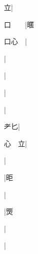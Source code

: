 \begin{multicols}{2}
{{\cjk{}{\cnsym{}　}{\cnsym{}　}立}|{}\par
{\cjk{}口{\cnsym{}　}{\cnsym{}　}}|{\cjk{}暱}\par
{\cjk{}口心{\cnsym{}　}}|{}\par
{\cjk{}{\cnsym{}　}{\cnsym{}　}{\cnsym{}　}}|{}\par
{\cjk{}{\cnsym{}　}{\cnsym{}　}{\cnsym{}　}}|{}\par
{\cjk{}{\cnsym{}　}{\cnsym{}　}{\cnsym{}　}}|{}\par
{\cjk{}{\cnsym{}　}{\cnsym{}　}{\cnsym{}　}}|{}\par
{\cjk{}{\cnsym{}　}耂匕}|{}\par
{\cjk{}心{\cnsym{}　}立}|{}\par
{\cjk{}{\cnsym{}　}{\cnsym{}　}{\cnsym{}　}}|{}\par
{\cjk{}{\cnsym{}　}{\cnsym{}　}{\cnsym{}　}}|{\cjk{}昛}\par
{\cjk{}{\cnsym{}　}{\cnsym{}　}{\cnsym{}　}}|{}\par
{\cjk{}{\cnsym{}　}{\cnsym{}　}{\cnsym{}　}}|{\cjk{}煚}\par
{}|{}\par
{\cjk{}{\cnsym{}　}{\cnsym{}　}{\cnsym{}　}}|{}\par
}
\end{multicols}
